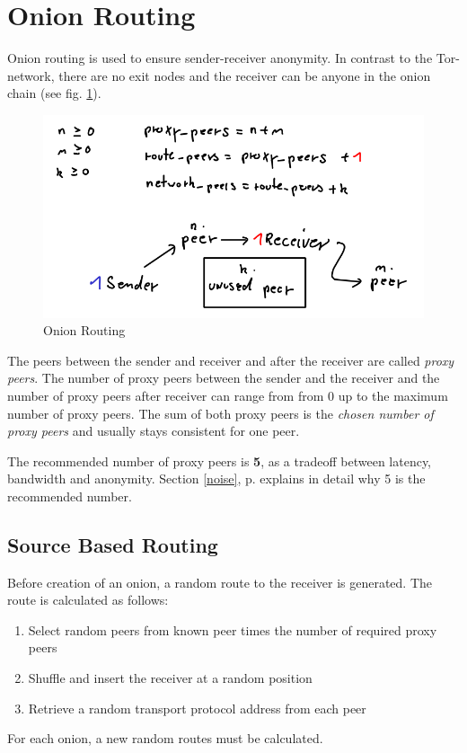 \section{Onion Routing}
\label{onionrouting}
Onion routing is used to ensure sender-receiver anonymity. In contrast
to the Tor-network, there are no exit nodes and the receiver can be anyone
in the onion chain (see fig. \ref{onionrouting}).
\begin{figure}
    \centering
    \caption{Onion Routing}
    \label{onionrouting}
    \includegraphics[scale=0.8]{onionrouting.png}
\end{figure}
The peers between the sender and receiver and after the receiver are
called \textit{proxy peers}. The number of proxy peers between the
sender and the receiver and the number of proxy peers after receiver
can range from from 0 up to the maximum number of proxy peers. The sum
of both proxy peers is the \textit{chosen number of proxy peers} and
usually stays consistent for one peer.

The recommended number of proxy peers is \textbf{5}, as a tradeoff between
latency, bandwidth and anonymity. Section \ref{noise}, p. \pageref{noise}
explains in detail why 5 is the recommended number.
\subsection{Source Based Routing}
Before creation of an onion, a random route to the receiver is generated.
The route is calculated as follows:
\begin{enumerate}
\item Select random peers from known peer times the number of required proxy peers
\item Shuffle and insert the receiver at a random position
\item Retrieve a random transport protocol address from each peer
\end{enumerate}
For each onion, a new random routes must be calculated.
